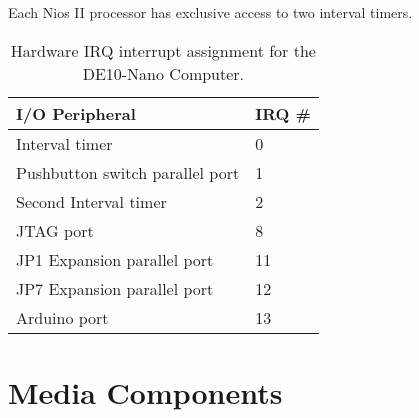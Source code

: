 












Each Nios II processor has exclusive access to two interval timers.






\begin{table}[h]
    \begin{center}
    \begin{tabular}{l|l}
            \textbf{I/O Peripheral} &
            \textbf{IRQ \#}
        \\\hline
            Interval timer & 0
        \\
            Pushbutton switch parallel port & 1
        \\
            Second Interval timer & 2
        \\
            JTAG port & 8
        \\
            JP1 Expansion parallel port & 11
        \\
            JP7 Expansion parallel port & 12
        \\
            Arduino port & 13
        \\
    \end{tabular}
    \caption{Hardware IRQ interrupt assignment for the DE10-Nano Computer.}
	 \label{tab:irq}
    \end{center}
\end{table}









\section{Media Components}
\label{sec:multi}

